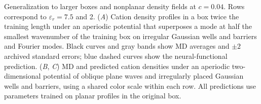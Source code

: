 \caption{Generalization to larger boxes and nonplanar density fields at $c=0.04$. Rows correspond to $\varepsilon_r=7.5$ and 2. (\textit{A}) Cation density profiles in a box twice the training length under an aperiodic potential that superposes a mode at half the smallest wavenumber of the training box on irregular Gaussian wells and barriers and Fourier modes. Black curves and gray bands show MD averages and $\pm2$ archived standard errors; blue dashed curves show the neural-functional prediction. (\textit{B}, \textit{C}) MD and predicted cation densities under an aperiodic two-dimensional potential of oblique plane waves and irregularly placed Gaussian wells and barriers, using a shared color scale within each row. All predictions use parameters trained on planar profiles in the original box.}
